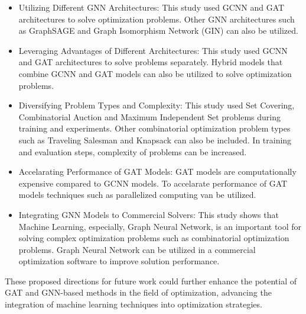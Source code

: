 \begin{itemize}
    \item Utilizing Different GNN Architectures: This study used GCNN and GAT architectures to solve optimization problems.
    Other GNN architectures such as GraphSAGE and Graph Isomorphism Network (GIN) can also be utilized.
    \item Leveraging Advantages of Different Architectures: This study used GCNN and GAT architectures to solve problems separately.
    Hybrid models that combine GCNN and GAT models can also be utilized to solve optimization problems.
    \item Diversifying Problem Types and Complexity: This study used Set Covering, Combinatorial Auction and Maximum Independent Set problems during training and experiments.
    Other combinatorial optimization problem types such as Traveling Salesman and Knapsack can also be included.
    In training and evaluation steps, complexity of problems can be increased.
    \item Accelarating Performance of GAT Models: GAT models are computationally expensive compared to GCNN models.
    To accelarate performance of GAT models techniques such as parallelized computing van be utilized.
    \item Integrating GNN Models to Commercial Solvers: This study shows that Machine Learning, especially, Graph Neural Network, is an important tool for solving complex optimization problems such as combinatorial optimization problems.
    Graph Neural Network can be utilized in a commercial optimization software to improve solution performance.
\end{itemize}


These proposed directions for future work could further enhance the potential of GAT and GNN-based methods in the field of optimization, advancing the integration of machine learning techniques into optimization strategies.